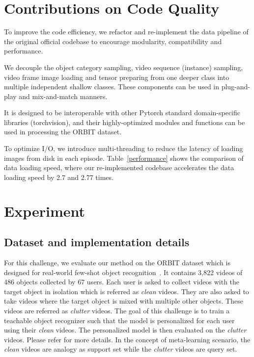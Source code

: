 
\section{Contributions on Code Quality}

To improve the code efficiency, we refactor and re-implement the data pipeline of the original official codebase to encourage modularity, compatibility and performance.

 We decouple the object category sampling, video sequence (instance) sampling, video frame image loading and tensor preparing from one deeper class into multiple independent shallow classes. These components can be used in plug-and-play and mix-and-match manners.

 It is designed to be interoperable with other Pytorch standard domain-specific libraries (torchvision), and their highly-optimized modules and functions can be used in processing the ORBIT dataset.

 To optimize I/O, we introduce multi-threading to reduce the latency of loading images from disk in each episode. Table~\ref{performance} shows the comparison of data loading speed, where our re-implemented codebase accelerates the data loading speed by 2.7 and 2.77 times.

\section{Experiment}

\subsection{Dataset and implementation details} 

 For this challenge, we evaluate our method on the ORBIT dataset which is designed for real-world few-shot object recognition~\cite{massiceti2021orbit}. It contains 3,822 videos of 486 objects collected by 67 users. Each user is asked to collect videos with the target object in isolation which is referred as \textit{clean} videos. They are also asked to take videos where the target object is mixed with multiple other objects. These videos are referred as \textit{clutter} videos. The goal of this challenge is to train a teachable object recognizer such that the model is personalized for each user using their \textit{clean} videos. The personalized model is then evaluated on the \textit{clutter} videos. Please refer \cite{massiceti2021orbit} for more details. In the concept of meta-learning scenario, the \textit{clean} videos are analogy as support set while the \textit{clutter} videos are query set. 

